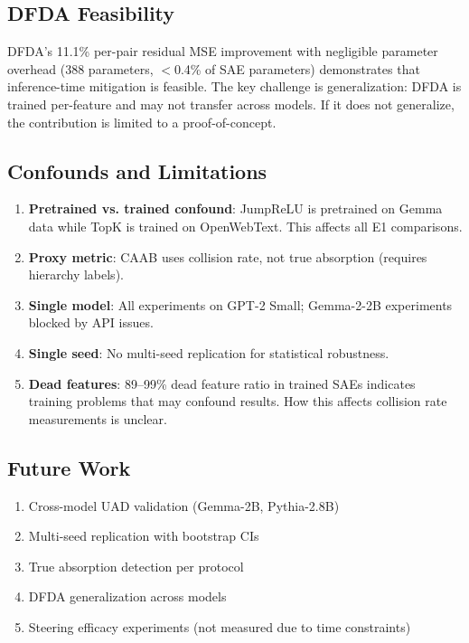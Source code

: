 \documentclass{article}
\begin{document}
\subsection{DFDA Feasibility}

DFDA's 11.1\% per-pair residual MSE improvement with negligible parameter overhead (388 parameters, $<$0.4\% of SAE parameters) demonstrates that inference-time mitigation is feasible. The key challenge is generalization: DFDA is trained per-feature and may not transfer across models. If it does not generalize, the contribution is limited to a proof-of-concept.

\subsection{Confounds and Limitations}

\begin{enumerate}
    \item \textbf{Pretrained vs. trained confound}: JumpReLU is pretrained on Gemma data while TopK is trained on OpenWebText. This affects all E1 comparisons.
    \item \textbf{Proxy metric}: CAAB uses collision rate, not true absorption (requires hierarchy labels).
    \item \textbf{Single model}: All experiments on GPT-2 Small; Gemma-2-2B experiments blocked by API issues.
    \item \textbf{Single seed}: No multi-seed replication for statistical robustness.
    \item \textbf{Dead features}: 89--99\% dead feature ratio in trained SAEs indicates training problems that may confound results. How this affects collision rate measurements is unclear.
\end{enumerate}

\subsection{Future Work}

\begin{enumerate}
    \item Cross-model UAD validation (Gemma-2B, Pythia-2.8B)
    \item Multi-seed replication with bootstrap CIs
    \item True absorption detection per \citet{chanin2024causal} protocol
    \item DFDA generalization across models
    \item Steering efficacy experiments (not measured due to time constraints)
\end{enumerate}
\end{document}
